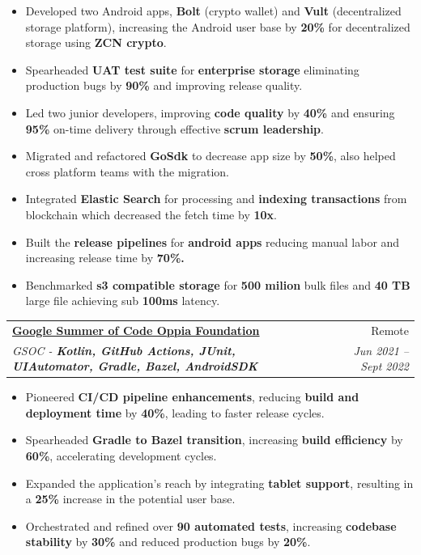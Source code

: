 \documentclass[letterpaper,1pt]{article}
\makeatletter
\newcommand{\resumeItem}[1]{
  \item\small{
    #1 \vspace{-2pt}
  }
}
\newcommand{\resumeSubheading}[4]{
  \item
    \begin{tabular*}{0.97\textwidth}{l@{\extracolsep{\fill}}r}
      \textbf{#1} & #2 \\
      \textit{\small#3} & \textit{\small #4} \\
    \end{tabular*}
}
\newcommand{\resumeItemListStart}{\vspace{-5pt}\begin{itemize}[leftmargin=8pt,itemsep=1pt,parsep=0pt]
  \selectfont\small
  \setlength\itemsep{0em}
  \setlength\parsep{0em}
  }
\newcommand{\resumeItemListEnd}{\end{itemize}}
\makeatother
\begin{document}
\resumeItemListStart
\resumeItem {Developed two Android apps, \textbf{Bolt} (crypto wallet) and \textbf{Vult} (decentralized storage platform), increasing the Android user base by \textbf{20\%} for decentralized storage using \textbf{ZCN crypto}.}
\resumeItem {Spearheaded \textbf{UAT test suite} for \textbf{enterprise storage} eliminating production bugs by \textbf{90\%} and improving release quality.}
\resumeItem {Led two junior developers, improving \textbf{code quality} by \textbf{40\%} and ensuring \textbf{95\%} on-time delivery through effective \textbf{scrum leadership}.}
\resumeItem{Migrated and refactored \textbf{GoSdk} to decrease app size by \textbf{50\%}, also helped cross platform teams with the migration.  }
\resumeItem{Integrated \textbf{Elastic Search} for processing and \textbf{indexing transactions} from blockchain which decreased the fetch time by \textbf{10x}.}
\resumeItem{Built the \textbf{release pipelines} for \textbf{android apps} reducing manual labor and increasing release time by \textbf{70\%.}}
\resumeItem{Benchmarked \textbf{s3 compatible storage} for \textbf{500 milion} bulk files and \textbf{40 TB} large file achieving sub \textbf{100ms} latency.}
\resumeItemListEnd

\resumeSubheading
{\href{https://docs.google.com/document/d/150Yk14Cxmy8OAbSSwgP1aXDBLo1b8HtuIhmrRhzEWU4/edit}{Google Summer of Code Oppia Foundation}}{Remote}
{GSOC - \textbf{Kotlin, GitHub Actions, JUnit, UIAutomator, Gradle, Bazel, AndroidSDK}}{Jun 2021 -- Sept 2022}
\resumeItemListStart
\resumeItem {Pioneered \textbf{CI/CD pipeline enhancements}, reducing \textbf{build and deployment time} by \textbf{40\%}, leading to faster release cycles.}
\resumeItem {Spearheaded \textbf{Gradle to Bazel transition}, increasing \textbf{build efficiency} by \textbf{60\%}, accelerating development cycles.}
\resumeItem {Expanded the application’s reach by integrating \textbf{tablet support}, resulting in a \textbf{25\%} increase in the potential user base.}
\resumeItem {Orchestrated and refined over \textbf{90 automated tests}, increasing \textbf{codebase stability} by \textbf{30\%} and reduced production bugs by \textbf{20\%}.}
\resumeItemListEnd
\end{document}

